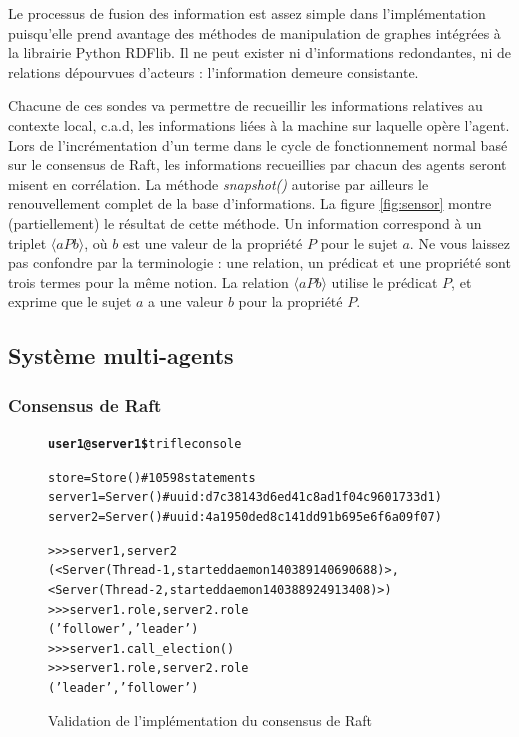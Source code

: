 Le processus de fusion des information est assez simple dans l'implémentation
puisqu'elle prend avantage des méthodes de manipulation de graphes intégrées à
la librairie Python RDFlib. Il ne peut exister ni d'informations redondantes, ni
de relations dépourvues d'acteurs : l'information demeure consistante.

Chacune de ces sondes va permettre de recueillir les informations relatives au
contexte local, c.a.d, les informations liées à la machine sur laquelle opère
l'agent. Lors de l'incrémentation d'un terme dans le cycle de fonctionnement
normal basé sur le consensus de Raft, les informations recueillies par chacun
des agents seront misent en corrélation. La méthode \emph{snapshot()} autorise
par ailleurs le renouvellement complet de la base d'informations.  La figure
\ref{fig:sensor} montre (partiellement) le résultat de cette méthode.  Un
information correspond à un triplet $\langle a P b \rangle$, où $b$ est une
valeur de la propriété $P$ pour le sujet $a$. Ne vous laissez pas confondre par
la terminologie : une relation, un prédicat et une propriété sont trois termes
pour la même notion. La relation $\langle a P b \rangle$ utilise le prédicat
$P$, et exprime que le sujet $a$ a une valeur $b$ pour la propriété $P$.

\subsection{Système multi-agents}

\subsubsection{Consensus de Raft}

\begin{figure}
  \begin{alltt}\scriptsize
    \textbf{user1@server1\$} trifle console

    store   = Store()  # 10598 statements
    server1 = Server() # uuid: d7c38143d6ed41c8ad1f04c9601733d1)
    server2 = Server() # uuid: 4a1950ded8c141dd91b695e6f6a09f07)
    
    >>> server1, server2
    (<Server(Thread-1, started daemon 140389140690688)>, 
     <Server(Thread-2, started daemon 140388924913408)>)
    >>> server1.role, server2.role
    ('follower', 'leader')
    >>> server1.call_election()
    >>> server1.role, server2.role
    ('leader', 'follower')
  \end{alltt}
  \caption{Validation de l'implémentation du consensus de Raft}
  \label{fig:raft}
\end{figure}

